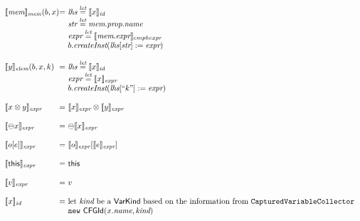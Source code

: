 \[\begin{array}{l@{}l@{~}l}
\transfun{\emph{mem}}_{\emph{mem}}(b, x)
& = & \emph{lhs} \letval \transfun{x}_{\emph{id}}\\
& & \emph{str} \letval \emph{mem}.\emph{prop}.\emph{name}\\
& & \emph{expr} \letval \transfun{\emph{mem}.\emph{expr}}_{emph{expr}}\\
& & b.\emph{createInst}(\emph{lhs}[\emph{str}] := \emph{expr})\\
& & \\

\transfun{y}_{\emph{elem}}(b, x, k)
& = & \emph{lhs} \letval \transfun{x}_{\emph{id}}\\
& & \emph{expr} \letval \transfun{x}_{\emph{expr}}\\
& & b.\emph{createInst}(\emph{lhs} [``k"] := \emph{expr})\\
& & \\

\transfun{x \inop y}_{\emph{expr}} & = & \transfun{x}_{\emph{expr}} \inop \transfun{y}_{\emph{expr}}\\
& & \\

\transfun{\preop x}_{\emph{expr}} & = & \preop \transfun{x}_{\emph{expr}}\\
& & \\

\transfun{o [e]}_{\emph{expr}} & = & \transfun{o}_{\emph{expr}} [ \transfun{e}_{\emph{expr}} ]\\
& & \\

\transfun{\this}_{\emph{expr}} & = & \this\\
& & \\

\transfun{v}_{\emph{expr}} & = & v\\
& & \\

\transfun{x}_{\emph{id}}
& = & \text{let }\emph{kind} \text{ be a } \VarKind \text{ based on the information from } \TT{CapturedVariableCollector}\\
& & \new\ \CFGId(x.\emph{name}, \emph{kind})\\
\end{array}
\]
\newpage
